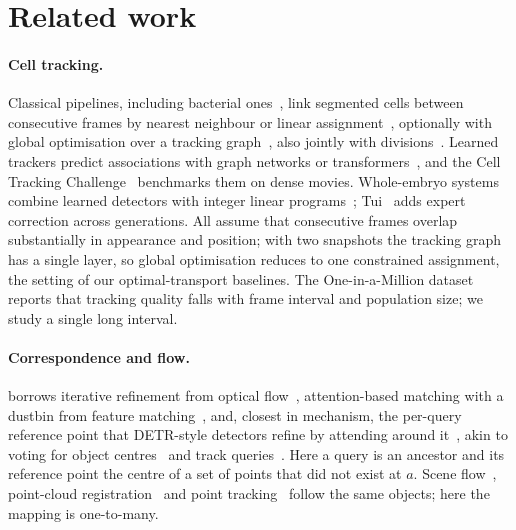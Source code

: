 \section{Related work}
\label{sec:related}

\paragraph{Cell tracking.}
Classical pipelines, including bacterial ones~\cite{stylianidou2016supersegger,lugagne2020delta,ollion2019bacmman,ollion2024distnet2d}, link segmented cells between consecutive frames by nearest neighbour or linear assignment~\cite{jaqaman2008robust,ershov2022trackmate}, optionally with global optimisation over a tracking graph~\cite{bragantini2024ultrack}, also jointly with divisions~\cite{schiegg2013conservation,jug2016moral}.
Learned trackers predict associations with graph networks or transformers~\cite{ben2022graph,gallusser2024trackastra,joy2021hipsc,fedorchuk2025deepkymo}, and the Cell Tracking Challenge~\cite{ulman2017objective,maska2023ctc} benchmarks them on dense movies.
Whole-embryo systems combine learned detectors with integer linear programs~\cite{malinmayor2023linajea,hirsch2022celegans,sugawara2022elephant}; Tui~\cite{chang2026tui} adds expert correction across generations.
All assume that consecutive frames overlap substantially in appearance and position; with two snapshots the tracking graph has a single layer, so global optimisation reduces to one constrained assignment, the setting of our optimal-transport baselines.
The One-in-a-Million dataset~\cite{seiffarth2024oiam} reports that tracking quality falls with frame interval and population size; we study a single long interval.

\paragraph{Correspondence and flow.}
\ours borrows iterative refinement from optical flow~\cite{teed2020raft}, attention-based matching with a dustbin from feature matching~\cite{sarlin2020superglue,lindenberger2023lightglue}, and, closest in mechanism, the per-query reference point that DETR-style detectors refine by attending around it~\cite{carion2020detr,zhu2021deformable,liu2022dabdetr}, akin to voting for object centres~\cite{qi2019votenet} and track queries~\cite{meinhardt2022trackformer,zeng2022motr}.
Here a query is an ancestor and its reference point the centre of a set of points that did not exist at $a$.
Scene flow~\cite{liu2019flownet3d,wu2020pointpwc,puy2020flot}, point-cloud registration~\cite{wang2019dcp,yew2020rpmnet} and point tracking~\cite{karaev2024cotracker} follow the same objects; here the mapping is one-to-many.


